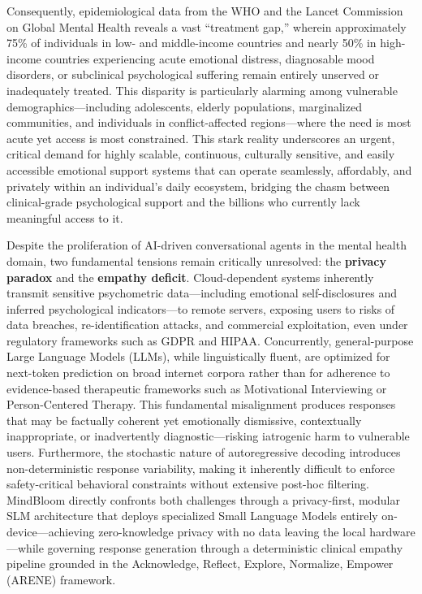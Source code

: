 \documentclass[12pt,twoside]{article}
\begin{document}
Consequently, epidemiological data from the WHO and the Lancet Commission on Global Mental Health reveals a vast ``treatment gap,'' wherein approximately 75\% of individuals in low- and middle-income countries and nearly 50\% in high-income countries experiencing acute emotional distress, diagnosable mood disorders, or subclinical psychological suffering remain entirely unserved or inadequately treated. This disparity is particularly alarming among vulnerable demographics---including adolescents, elderly populations, marginalized communities, and individuals in conflict-affected regions---where the need is most acute yet access is most constrained. This stark reality underscores an urgent, critical demand for highly scalable, continuous, culturally sensitive, and easily accessible emotional support systems that can operate seamlessly, affordably, and privately within an individual's daily ecosystem, bridging the chasm between clinical-grade psychological support and the billions who currently lack meaningful access to it.

Despite the proliferation of AI-driven conversational agents in the mental health domain, two fundamental tensions remain critically unresolved: the \textbf{privacy paradox} and the \textbf{empathy deficit}. Cloud-dependent systems inherently transmit sensitive psychometric data---including emotional self-disclosures and inferred psychological indicators---to remote servers, exposing users to risks of data breaches, re-identification attacks, and commercial exploitation, even under regulatory frameworks such as GDPR and HIPAA. Concurrently, general-purpose Large Language Models (LLMs), while linguistically fluent, are optimized for next-token prediction on broad internet corpora rather than for adherence to evidence-based therapeutic frameworks such as Motivational Interviewing or Person-Centered Therapy. This fundamental misalignment produces responses that may be factually coherent yet emotionally dismissive, contextually inappropriate, or inadvertently diagnostic---risking iatrogenic harm to vulnerable users. Furthermore, the stochastic nature of autoregressive decoding introduces non-deterministic response variability, making it inherently difficult to enforce safety-critical behavioral constraints without extensive post-hoc filtering. MindBloom directly confronts both challenges through a privacy-first, modular SLM architecture that deploys specialized Small Language Models entirely on-device---achieving zero-knowledge privacy with no data leaving the local hardware---while governing response generation through a deterministic clinical empathy pipeline grounded in the Acknowledge, Reflect, Explore, Normalize, Empower (ARENE) framework.
\end{document}
